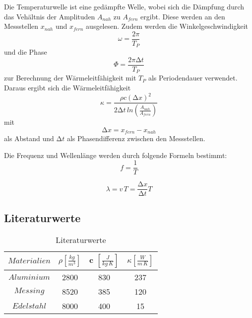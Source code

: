 Die Temperaturwelle ist eine gedämpfte Welle, wobei sich die Dämpfung
durch das Vehältnis der Amplituden $A_{nah}$ zu $A_{fern}$ ergibt. Diese
werden an den Messstellen $x_{nah}$ und $x_{fern}$ ausgelesen.
Zudem werden die Winkelgeschwindigkeit
\begin{equation}
  \omega = \frac{2\pi}{T_{P}}
  \label{eqn:omega}
\end{equation}
und die Phase
\begin{equation}
  \Phi = \frac{2\pi\increment t}{T_P}
  \label{eqn:phi}
\end{equation}
zur Berechnung der Wärmeleitfähigkeit mit $T_P$
als Periodendauer verwendet.
Daraus ergibt sich die Wärmeleitfähigkeit
\begin{equation}
  \kappa = \frac{\rho c (\increment x)^2}{2\increment t \, ln(\frac{A_{nah}}
  {A_{fern}})}
  \label{eqn:kappa}
\end{equation}
mit
\begin{equation}
  \increment x = x_{fern} - x_{nah}
  \label{eqn:deltax}
\end{equation}
als Abstand und $\increment t$ als Phasendifferenz zwischen den Messstellen.



Die Frequenz und Wellenlänge werden durch folgende Formeln bestimmt:
\begin{equation}
  f = \frac{1}{T}
  \label{eqn:Hz}
\end{equation}

\begin{equation}
  \lambda = v\, T = \frac{\increment x}{\increment t} T
  \label{eqn:lambda}
\end{equation}


\subsection{Literaturwerte}

\begin{table}[h]
  \centering
  \label{tab:lit}
  \begin{tabular}{ c c c c }
    \toprule
    $Materialien$ & $ \rho \left[\frac{kg}{m^3}\right]$ &
    c $\left[\frac{J}{kg \, K}\right]$  & $\kappa \left[\frac{W}{m\,K}\right]$
    \\
    \midrule
    $Aluminium$ & 2800 & 830 & 237 \\
    $Messing$ & 8520 & 385 &  120 \\
    $Edelstahl$ & 8000 & 400 & 15 \\
    \bottomrule
  \end{tabular}
  \caption{Literaturwerte \cite{spez} }
\end{table}
\newpage
